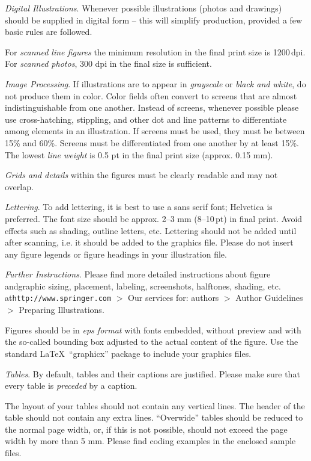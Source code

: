\documentclass[graybox]{svmono}
\begin{document}
\emph{Digital Illustrations}. Whenever possible illustrations (photos and drawings) should be supplied in digital form -- this will simplify production, provided a few basic rules are followed.

For \emph{scanned line figures} the minimum resolution in the final print size is 1200\,dpi. For \emph{scanned photos}, 300 dpi in the final size is sufficient.

\emph{Image Processing}. If illustrations are to appear in \textit{grayscale} or \textit{black and white}, do not produce them in color. Color fields often convert to screens that are almost indistinguishable from one another. Instead of screens, whenever possible please use cross-hatching, stippling, and other dot and line patterns to differentiate among elements in an illustration. If screens must be used, they must be between 15\% and 60\%. Screens must be differentiated from one another by at least 15\%. The lowest \emph{line weight} is 0.5 pt in the final print size (approx. 0.15 mm).

\emph{Grids and details} within the figures must be clearly readable and may not overlap.

\enlargethispage{12pt}

\emph{Lettering}. To add lettering, it is best to use a sans serif font; Helvetica is preferred. The font size should be approx. 2--3 mm (8--10\,pt) in final print. Avoid effects such as shading, outline letters, etc. Lettering should not be added until after scanning, i.e. it should be added to the graphics file. Please do not insert any figure legends or figure headings in your illustration file.

\emph{Further Instructions}. Please find more detailed instructions about figure and\break graphic sizing, placement, labeling, screenshots, halftones, shading, etc. at\break \texttt{http://www.springer.com} $>$ Our services for: authors $>$ Author Guidelines $>$ Preparing Illustrations.

Figures should be in \emph{eps format} with fonts embedded, without preview and with the so-called bounding box adjusted to the actual content of the figure. Use the standard \LaTeX~``graphicx'' package to include your graphics files.

\emph{Tables}. By default, tables and their captions are justified. Please make sure that every table is \emph{preceded} by a caption.

The layout of your tables should not contain any vertical lines. The header of the table should not contain any extra lines. ``Overwide'' tables should be reduced to the normal page width, or, if this is not possible, should not exceed the page width by more than 5 mm. Please find coding examples in the enclosed sample files.
\end{document}
